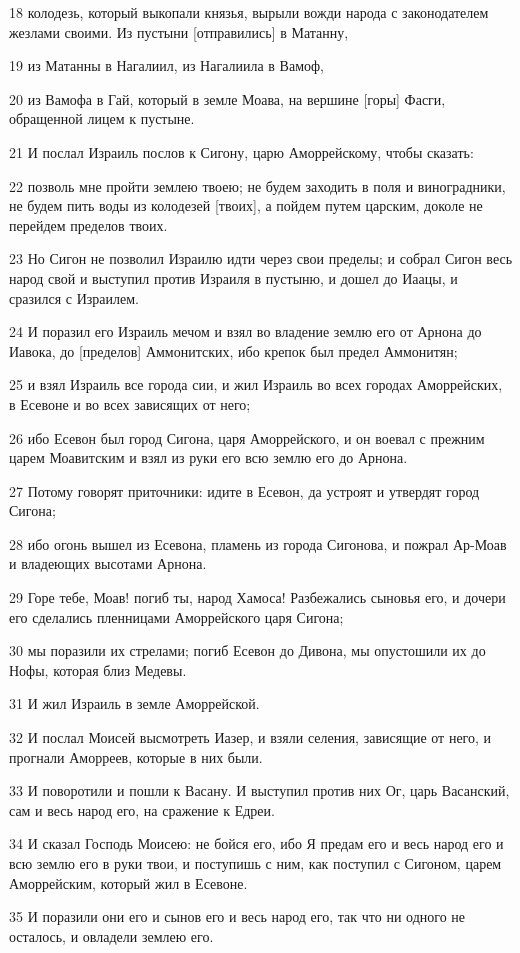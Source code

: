 \par 18 колодезь, который выкопали князья, вырыли вожди народа с законодателем жезлами своими. Из пустыни [отправились] в Матанну,
\par 19 из Матанны в Нагалиил, из Нагалиила в Вамоф,
\par 20 из Вамофа в Гай, который в земле Моава, на вершине [горы] Фасги, обращенной лицем к пустыне.
\par 21 И послал Израиль послов к Сигону, царю Аморрейскому, чтобы сказать:
\par 22 позволь мне пройти землею твоею; не будем заходить в поля и виноградники, не будем пить воды из колодезей [твоих], а пойдем путем царским, доколе не перейдем пределов твоих.
\par 23 Но Сигон не позволил Израилю идти через свои пределы; и собрал Сигон весь народ свой и выступил против Израиля в пустыню, и дошел до Иаацы, и сразился с Израилем.
\par 24 И поразил его Израиль мечом и взял во владение землю его от Арнона до Иавока, до [пределов] Аммонитских, ибо крепок был предел Аммонитян;
\par 25 и взял Израиль все города сии, и жил Израиль во всех городах Аморрейских, в Есевоне и во всех зависящих от него;
\par 26 ибо Есевон был город Сигона, царя Аморрейского, и он воевал с прежним царем Моавитским и взял из руки его всю землю его до Арнона.
\par 27 Потому говорят приточники: идите в Есевон, да устроят и утвердят город Сигона;
\par 28 ибо огонь вышел из Есевона, пламень из города Сигонова, и пожрал Ар-Моав и владеющих высотами Арнона.
\par 29 Горе тебе, Моав! погиб ты, народ Хамоса! Разбежались сыновья его, и дочери его сделались пленницами Аморрейского царя Сигона;
\par 30 мы поразили их стрелами; погиб Есевон до Дивона, мы опустошили их до Нофы, которая близ Медевы.
\par 31 И жил Израиль в земле Аморрейской.
\par 32 И послал Моисей высмотреть Иазер, и взяли селения, зависящие от него, и прогнали Аморреев, которые в них были.
\par 33 И поворотили и пошли к Васану. И выступил против них Ог, царь Васанский, сам и весь народ его, на сражение к Едреи.
\par 34 И сказал Господь Моисею: не бойся его, ибо Я предам его и весь народ его и всю землю его в руки твои, и поступишь с ним, как поступил с Сигоном, царем Аморрейским, который жил в Есевоне.
\par 35 И поразили они его и сынов его и весь народ его, так что ни одного не осталось, и овладели землею его.

